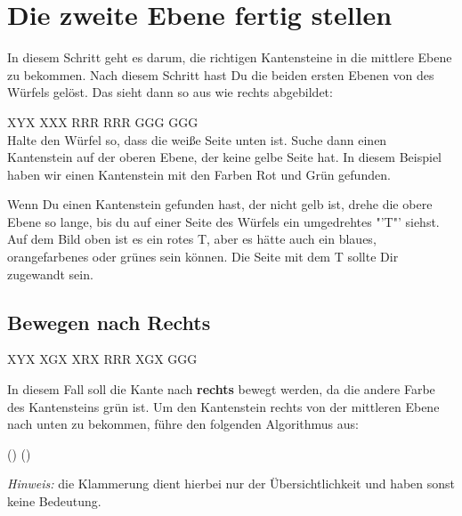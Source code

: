 \section{Die zweite Ebene fertig stellen}
\parbox{0.7\linewidth}{
In diesem Schritt geht es darum, die richtigen Kantensteine in die mittlere Ebene zu bekommen.
Nach diesem Schritt hast Du die beiden ersten Ebenen von des Würfels gelöst.
Das sieht dann so aus wie rechts abgebildet:
}
\RubikCubeGreyAll%
            {X}{Y}{X}
            {X}{X}{X}%
               {R}{R}{R}
	       {R}{R}{R}%
	       {G}{G}{G}
	       {G}{G}{G}%
\\[1em]

Halte den Würfel so, dass die weiße Seite unten ist.
Suche dann einen Kantenstein auf der oberen Ebene, der keine gelbe Seite hat.
In diesem Beispiel haben wir einen Kantenstein mit den Farben Rot und Grün gefunden.

Wenn Du einen Kantenstein gefunden hast, der nicht gelb ist, drehe die obere Ebene so lange, bis du auf einer Seite des Würfels ein umgedrehtes "'T"' siehst.
Auf dem Bild oben ist es ein rotes T, aber es hätte auch ein blaues, orangefarbenes oder grünes sein können.
Die Seite mit dem T sollte Dir zugewandt sein.

\subsection{Bewegen nach Rechts}
\RubikCubeGreyAll%
            {X}{Y}{X}
            {X}{G}{X}%
               {X}{R}{X}
	       {R}{R}{R}%
	       {X}{G}{X}
	       {G}{G}{G}%
\parbox{0.7\linewidth}{
  In diesem Fall soll die Kante nach \textbf{rechts} bewegt werden, da die andere
  Farbe des Kantensteins grün ist. Um den Kantenstein rechts von der mittleren
  Ebene nach unten zu bekommen, führe den folgenden Algorithmus aus:
}
\begin{center}
	\sffamily\Large () ()
\end{center}
\emph{Hinweis:} die Klammerung dient hierbei nur der Übersichtlichkeit und haben sonst keine Bedeutung.

